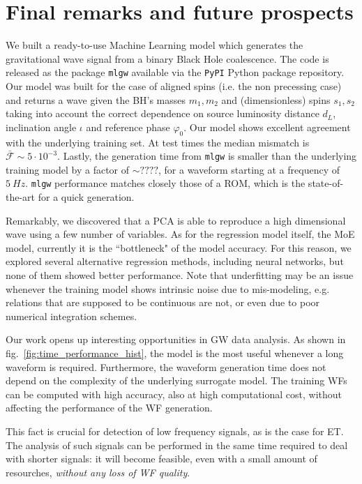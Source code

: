 \section{Final remarks and future prospects}
We built a ready-to-use Machine Learning model which generates the gravitational wave signal from a binary Black Hole coalescence. The code is released as the package \texttt{mlgw} available via the \texttt{PyPI} Python package repository. 
Our model was built for the case of aligned spins (i.e. the non precessing case) and returns a wave given the BH's masses $m_1, m_2$ and (dimensionless) spins $s_1, s_2$ taking into account the correct dependence on source luminosity distance $d_L$, inclination angle $\iota$ and reference phase $\varphi_0$.
Our model shows excellent agreement with the underlying training set. At test times the median mismatch is $\bar{\mathcal{F}}\sim 5 \cdot 10^{-3}$. Lastly, the generation time from \texttt{mlgw} is smaller than the underlying training model by a factor of $\sim ????$, for a waveform starting at a frequency of $\SI{5}{Hz}$.
\texttt{mlgw} performance matches closely those of a ROM, which is the state-of-the-art for a quick generation.
\par
Remarkably, we discovered that a PCA is able to reproduce a high dimensional wave using a few number of variables. As for the regression model itself, the MoE model, currently it is the ``bottleneck" of the model accuracy. For this reason, we explored several alternative regression methods, including neural networks, but none of them showed better performance.
Note that underfitting may be an issue whenever the training model shows intrinsic noise due to mis-modeling, e.g. relations that are supposed to be continuous are not, or even due to poor numerical integration schemes.
\par
Our work opens up interesting opportunities in GW data analysis.
As shown in fig.~\ref{fig:time_performance_hist}, the model is the most useful whenever a long waveform is required. Furthermore, the waveform generation time does not depend on the complexity of the underlying surrogate model. The training WFs can be computed with high accuracy, also at high computational cost, without affecting the performance of the WF generation.
\par
This fact is crucial for detection of low frequency signals, as is the case for ET. The analysis of such signals can be performed in the same time required to deal with shorter signals: it will become feasible, even with a small amount of resourches, \textit{without any loss of WF quality}.
